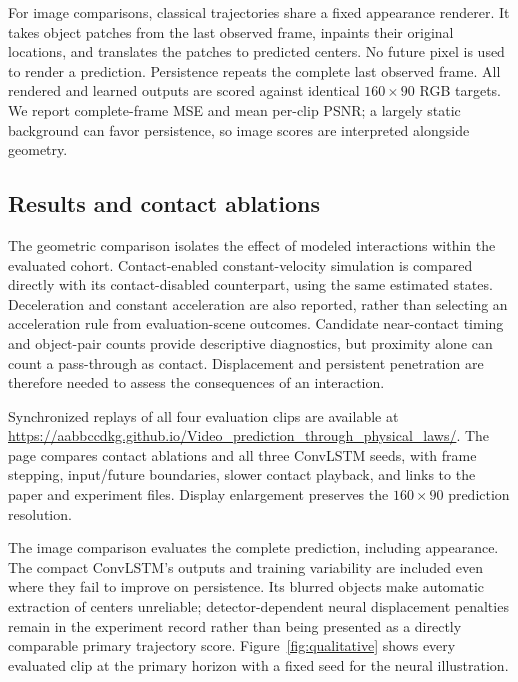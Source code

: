 For image comparisons, classical trajectories share a fixed appearance renderer. It takes object patches from the last observed frame, inpaints their original locations, and translates the patches to predicted centers. No future pixel is used to render a prediction. Persistence repeats the complete last observed frame. All rendered and learned outputs are scored against identical $160\times90$ RGB targets. We report complete-frame MSE and mean per-clip PSNR; a largely static background can favor persistence, so image scores are interpreted alongside geometry.

\subsection{Results and contact ablations}



The geometric comparison isolates the effect of modeled interactions within the evaluated cohort. Contact-enabled constant-velocity simulation is compared directly with its contact-disabled counterpart, using the same estimated states. Deceleration and constant acceleration are also reported, rather than selecting an acceleration rule from evaluation-scene outcomes. Candidate near-contact timing and object-pair counts provide descriptive diagnostics, but proximity alone can count a pass-through as contact. Displacement and persistent penetration are therefore needed to assess the consequences of an interaction.

Synchronized replays of all four evaluation clips are available at \url{https://aabbccdkg.github.io/Video_prediction_through_physical_laws/}. The page compares contact ablations and all three ConvLSTM seeds, with frame stepping, input/future boundaries, slower contact playback, and links to the paper and experiment files. Display enlargement preserves the $160\times90$ prediction resolution.

The image comparison evaluates the complete prediction, including appearance. The compact ConvLSTM's outputs and training variability are included even where they fail to improve on persistence. Its blurred objects make automatic extraction of centers unreliable; detector-dependent neural displacement penalties remain in the experiment record rather than being presented as a directly comparable primary trajectory score. Figure~\ref{fig:qualitative} shows every evaluated clip at the primary horizon with a fixed seed for the neural illustration.

